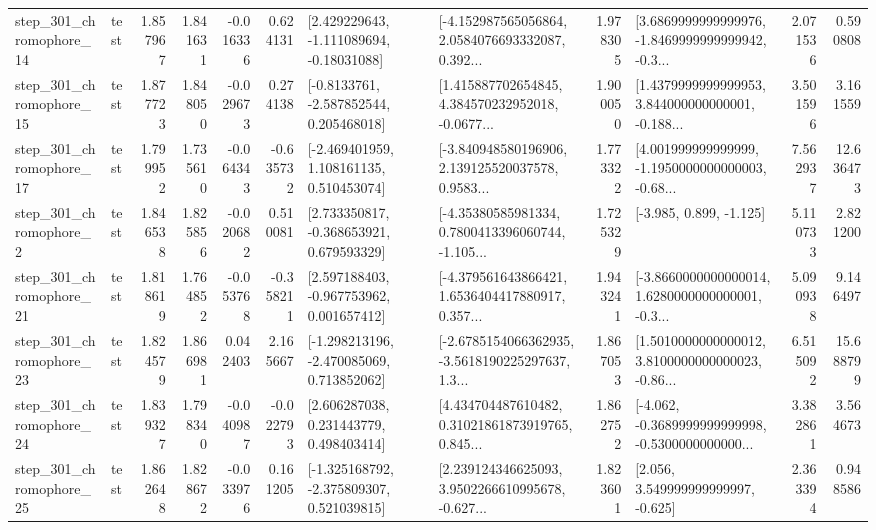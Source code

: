 \begin{tabular}{llrrrrllrlrr}
  step\_301\_chromophore\_14 &      test &      1.857967 &    1.841631 &     -0.016336 &  0.624131 &    [2.429229643, -1.111089694, -0.18031088] &  [-4.152987565056864, 2.0584076693332087, 0.392... &       1.978305 &  [3.6869999999999976, -1.8469999999999942, -0.3... &            2.071536 &          0.590808 \\
  step\_301\_chromophore\_15 &      test &      1.877723 &    1.848050 &     -0.029673 &  0.274138 &     [-0.8133761, -2.587852544, 0.205468018] &  [1.415887702654845, 4.384570232952018, -0.0677... &       1.900050 &  [1.4379999999999953, 3.844000000000001, -0.188... &            3.501596 &          3.161559 \\
  step\_301\_chromophore\_17 &      test &      1.799952 &    1.735610 &     -0.064343 & -0.635732 &    [-2.469401959, 1.108161135, 0.510453074] &  [-3.840948580196906, 2.139125520037578, 0.9583... &       1.773322 &  [4.001999999999999, -1.1950000000000003, -0.68... &            7.562937 &         12.636473 \\
   step\_301\_chromophore\_2 &      test &      1.846538 &    1.825856 &     -0.020682 &  0.510081 &    [2.733350817, -0.368653921, 0.679593329] &  [-4.35380585981334, 0.7800413396060744, -1.105... &       1.725329 &                            [-3.985, 0.899, -1.125] &            5.110733 &          2.821200 \\
  step\_301\_chromophore\_21 &      test &      1.818619 &    1.764852 &     -0.053768 & -0.358211 &    [2.597188403, -0.967753962, 0.001657412] &  [-4.379561643866421, 1.6536404417880917, 0.357... &       1.943241 &  [-3.8660000000000014, 1.6280000000000001, -0.3... &            5.090938 &          9.146497 \\
  step\_301\_chromophore\_23 &      test &      1.824579 &    1.866981 &      0.042403 &  2.165667 &   [-1.298213196, -2.470085069, 0.713852062] &  [-2.6785154066362935, -3.5618190225297637, 1.3... &       1.867053 &  [1.5010000000000012, 3.8100000000000023, -0.86... &            6.515092 &         15.688799 \\
  step\_301\_chromophore\_24 &      test &      1.839327 &    1.798340 &     -0.040987 & -0.022793 &     [2.606287038, 0.231443779, 0.498403414] &  [4.434704487610482, 0.31021861873919765, 0.845... &       1.862752 &  [-4.062, -0.3689999999999998, -0.5300000000000... &            3.382861 &          3.564673 \\
  step\_301\_chromophore\_25 &      test &      1.862648 &    1.828672 &     -0.033976 &  0.161205 &   [-1.325168792, -2.375809307, 0.521039815] &  [2.239124346625093, 3.9502266610995678, -0.627... &       1.823601 &                 [2.056, 3.549999999999997, -0.625] &            2.363394 &          0.948586 \\

\end{tabular}
